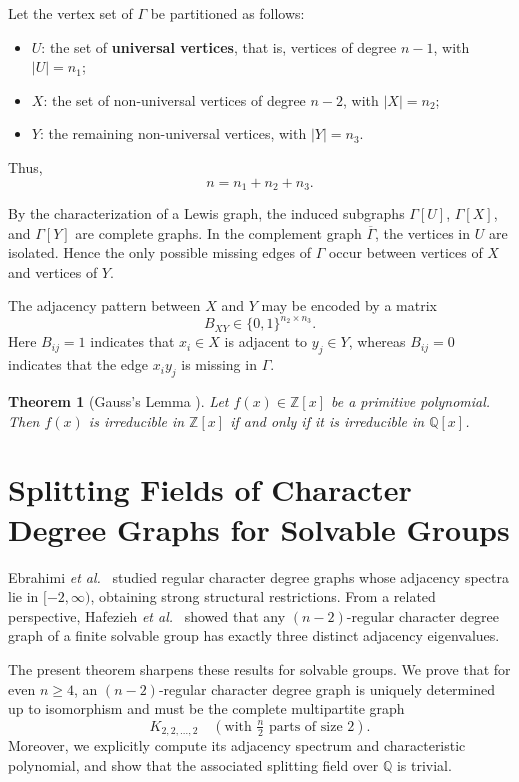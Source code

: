 \documentclass[11pt]{amsart}
\newtheorem{thm}{\bf Theorem}[section]
\begin{document}
Let the vertex set of \( \Gamma \) be partitioned as follows:
\begin{itemize}[label=--]
    \item \( U \): the set of \textbf{universal vertices}, that is, vertices of degree \( n-1 \), with \( |U|=n_1 \);
    \item \( X \): the set of non-universal vertices of degree \( n-2 \), with \( |X|=n_2 \);
    \item \( Y \): the remaining non-universal vertices, with \( |Y|=n_3 \).
\end{itemize}
Thus,
\[
n=n_1+n_2+n_3.
\]

By the characterization of a Lewis graph, the induced subgraphs \( \Gamma[U] \), \( \Gamma[X] \), and \( \Gamma[Y] \) are complete graphs. In the complement graph \( \overline{\Gamma} \), the vertices in \( U \) are isolated. Hence the only possible missing edges of \( \Gamma \) occur between vertices of \( X \) and vertices of \( Y \).

The adjacency pattern between \( X \) and \( Y \) may be encoded by a matrix
\[
B_{XY}\in \{0,1\}^{n_2\times n_3}.
\]
Here \( B_{ij}=1 \) indicates that \( x_i\in X \) is adjacent to \( y_j\in Y \), whereas \( B_{ij}=0 \) indicates that the edge \( x_i y_j \) is missing in \( \Gamma \).

\begin{thm}[Gauss’s Lemma {\cite{DummitFoote}}]\label{1.7}
Let \( f(x)\in\mathbb{Z}[x] \) be a \emph{primitive} polynomial. Then \( f(x) \) is irreducible in \( \mathbb{Z}[x] \) if and only if it is irreducible in \( \mathbb{Q}[x] \).
\end{thm}


\section{Splitting Fields of Character Degree Graphs for Solvable Groups}


Ebrahimi \emph{et al.}~\cite{Ebrahimi2023} studied regular character degree graphs whose adjacency spectra lie in $[-2,\infty)$, obtaining strong structural restrictions. From a related perspective, Hafezieh \emph{et al.}~\cite{Hafezieh2021} showed that any $(n-2)$-regular character degree graph of a finite solvable group has exactly three distinct adjacency eigenvalues.

The present theorem sharpens these results for solvable groups. We prove that for even $n\ge4$, an $(n-2)$-regular character degree graph is uniquely determined up to isomorphism and must be the complete multipartite graph
\[
K_{2,2,\dots,2}\quad\left(\text{with } \tfrac{n}{2}\text{ parts of size }2\right).
\]
Moreover, we explicitly compute its adjacency spectrum and characteristic polynomial, and show that the associated splitting field over $\mathbb{Q}$ is trivial.
\end{document}
